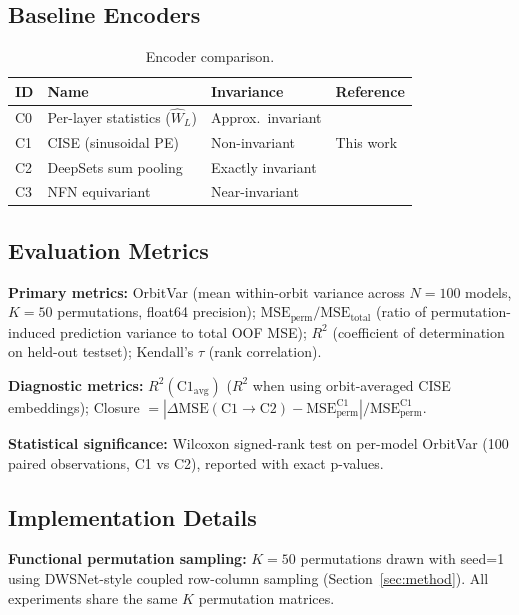 \subsection{Baseline Encoders}

\begin{table}[h]
\centering
\caption{Encoder comparison.}
\label{tab:encoders}
\begin{tabular}{llll}
\toprule
ID & Name & Invariance & Reference \\
\midrule
C0 & Per-layer statistics ($\hat{W}_L$) & Approx.\ invariant & \citet{Unterthiner2020Predicting} \\
C1 & CISE (sinusoidal PE) & Non-invariant & This work \\
C2 & DeepSets sum pooling & Exactly invariant & \citet{Zaheer2017Deep} \\
C3 & NFN equivariant & Near-invariant & \citet{Zhou2023Permutation} \\
\bottomrule
\end{tabular}
\end{table}

\subsection{Evaluation Metrics}

\textbf{Primary metrics:} OrbitVar (mean within-orbit variance across $N=100$ models, $K=50$ permutations, float64 precision); $\text{MSE}_\text{perm} / \text{MSE}_\text{total}$ (ratio of permutation-induced prediction variance to total OOF MSE); $R^2$ (coefficient of determination on held-out testset); Kendall's $\tau$ (rank correlation).

\textbf{Diagnostic metrics:} $R^2(\text{C1}_\text{avg})$ ($R^2$ when using orbit-averaged CISE embeddings); Closure $= |\Delta\text{MSE}(\text{C1}{\to}\text{C2}) - \text{MSE}_\text{perm}^\text{C1}| / \text{MSE}_\text{perm}^\text{C1}$.

\textbf{Statistical significance:} Wilcoxon signed-rank test on per-model OrbitVar (100 paired observations, C1 vs C2), reported with exact p-values.

\subsection{Implementation Details}

\textbf{Functional permutation sampling:} $K=50$ permutations drawn with seed=1 using DWSNet-style coupled row-column sampling (Section~\ref{sec:method}). All experiments share the same $K$ permutation matrices.

